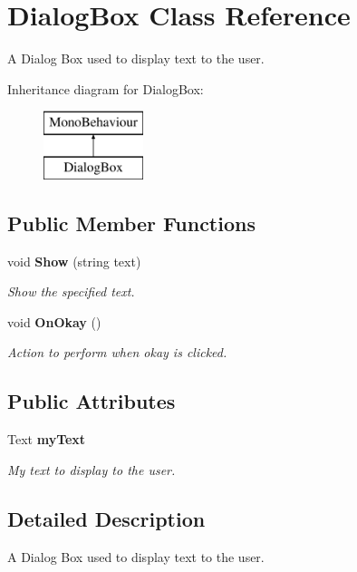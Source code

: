 \section{Dialog\+Box Class Reference}
\label{class_dialog_box}


A Dialog Box used to display text to the user.  


Inheritance diagram for Dialog\+Box\+:\begin{figure}[H]
\begin{center}
\leavevmode
\includegraphics[height=2.000000cm]{class_dialog_box}
\end{center}
\end{figure}
\subsection*{Public Member Functions}
\begin{DoxyCompactItemize}
\item 
void {\bf Show} (string text)
\begin{DoxyCompactList}\small\item\em Show the specified text. \end{DoxyCompactList}\item 
void {\bf On\+Okay} ()
\begin{DoxyCompactList}\small\item\em Action to perform when okay is clicked. \end{DoxyCompactList}\end{DoxyCompactItemize}
\subsection*{Public Attributes}
\begin{DoxyCompactItemize}
\item 
Text {\bf my\+Text}
\begin{DoxyCompactList}\small\item\em My text to display to the user. \end{DoxyCompactList}\end{DoxyCompactItemize}


\subsection{Detailed Description}
A Dialog Box used to display text to the user. 




